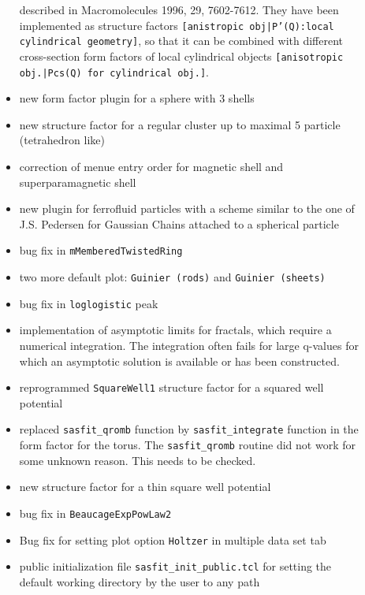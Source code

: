 \begin{description}
\begin{itemize}
              described in Macromolecules 1996, 29, 7602-7612. They have
              been implemented as structure factors
              \texttt{[anistropic obj|P'(Q):local cylindrical geometry]},
              so that it can be combined with different cross-section
              form factors of local cylindrical objects
              \texttt{[anisotropic obj.|Pcs(Q) for cylindrical obj.]}.
        \item new form factor plugin for a sphere with 3 shells
        \item new structure factor for a regular cluster up to maximal 5 particle
              (tetrahedron like)
        \item correction of menue entry order for magnetic shell and
              superparamagnetic shell
        \item new plugin for ferrofluid particles with a scheme similar to
              the one of J.S. Pedersen for Gaussian Chains attached to a spherical particle
        \item bug fix in \texttt{mMemberedTwistedRing}
        \item two more default plot: \texttt{Guinier (rods)} and \texttt{Guinier (sheets)}
        \item bug fix in \texttt{loglogistic} peak
        \item implementation of asymptotic limits for fractals, which require a
              numerical integration. The integration often fails for large q-values
              for which an asymptotic solution is available or has been constructed.
        \item reprogrammed \texttt{SquareWell1} structure factor for a squared well potential
        \item replaced \texttt{sasfit\_qromb} function by \texttt{sasfit\_integrate} function in the
              form factor for the torus. The \texttt{sasfit\_qromb} routine did not work for some
              unknown reason. This needs to be checked.
        \item new structure factor for a thin square well potential
        \item bug fix in \texttt{BeaucageExpPowLaw2}
        \item Bug fix for setting plot option
              \texttt{Holtzer} in multiple data set tab
        \item public initialization file \texttt{sasfit\_init\_public.tcl} for setting
              the default working directory by the user to any path
        \end{itemize}

\end{description}
